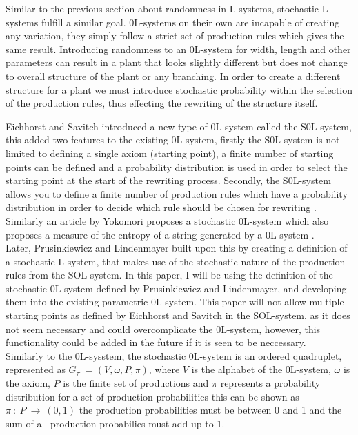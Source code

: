 \begin{flushleft}

Similar to the previous section about randomness in L-systems, stochastic L-systems fulfill a similar goal. 0L-systems on their own are incapable of creating any variation, they simply follow a strict set of production rules which gives the same result. Introducing randomness to an 0L-system for width, length and other parameters can result in a plant that looks slightly different but does not change to overall structure of the plant or any branching. In order to create a different structure for a plant we must introduce stochastic probability within the selection of the production rules, thus effecting the rewriting of the structure itself. \\

\vspace{5mm}

Eichhorst and Savitch introduced a new type of 0L-system called the S0L-system, this added two features to the existing 0L-system, firstly the S0L-system is not limited to defining a single axiom (starting point), a finite number of starting points can be defined and a probability distribution is used in order to select the starting point at the start of the rewriting process. Secondly, the S0L-system allows you to define a finite number of production rules which have a probability distribution in order to decide which rule should be chosen for rewriting \cite{eichhorst1980growth}. Similarly an article by Yokomori proposes a stochastic 0L-system which also proposes a measure of the entropy of a string generated by a 0L-system \cite{yokomori1980stochastic}.\\
Later, Prusinkiewicz and Lindenmayer built upon this by creating a definition of a stochastic L-system, that makes use of the stochastic nature of the production rules from the SOL-system. In this paper, I will be using the definition of the stochastic 0L-system defined by Prusinkiewicz and Lindenmayer, and developing them into the existing parametric 0L-system. This paper will not allow multiple starting points as defined by Eichhorst and Savitch in the SOL-system, as it does not seem necessary and could overcomplicate the 0L-system, however, this functionality could be added in the future if it is seen to be neccessary. \\
Similarly to the 0L-sysstem, the stochastic 0L-system is an ordered quadruplet, represented as $G_\pi~ = (V, \omega, P, \pi)$, where $V$ is the alphabet of the 0L-system, $\omega$ is the axiom, $P$ is the finite set of productions and $\pi$ represents a probability distribution for a set of production probabilities this can be shown as $\pi~ :~ P~ \rightarrow~ (0, 1)$ the production probabilities must be between 0 and 1 and the sum of all production probabilies must add up to 1. \\


\end{flushleft}
